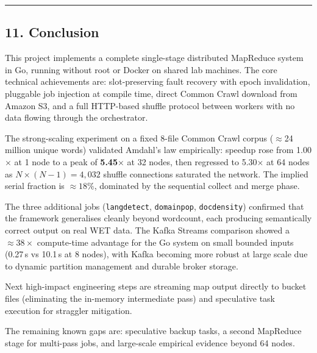 \documentclass[
]{article}
\begin{document}
\begin{center}\rule{0.5\linewidth}{0.5pt}\end{center}

\subsection{11. Conclusion}\label{conclusion}

This project implements a complete single-stage distributed MapReduce system
in Go, running without root or Docker on shared lab machines. The core
technical achievements are: slot-preserving fault recovery with epoch
invalidation, pluggable job injection at compile time, direct Common Crawl
download from Amazon S3, and a full HTTP-based shuffle protocol between workers
with no data flowing through the orchestrator.

The strong-scaling experiment on a fixed 8-file Common Crawl corpus
(\(\approx\)24 million unique words) validated Amdahl's law empirically:
speedup rose from 1.00$\times$ at 1 node to a peak of \textbf{5.45$\times$}
at 32 nodes, then regressed to 5.30$\times$ at 64 nodes as
\(N \times (N-1) = 4{,}032\) shuffle connections saturated the network.
The implied serial fraction is \(\approx 18\%\), dominated by the
sequential collect and merge phase.

The three additional jobs (\texttt{langdetect}, \texttt{domainpop},
\texttt{docdensity}) confirmed that the framework generalises cleanly beyond
wordcount, each producing semantically correct output on real WET data. The
Kafka Streams comparison showed a \(\approx 38\times\) compute-time advantage
for the Go system on small bounded inputs (0.27\,s vs 10.1\,s at 8 nodes),
with Kafka becoming more robust at large scale due to dynamic partition
management and durable broker storage.

Next high-impact engineering steps are streaming map output directly to bucket
files (eliminating the in-memory intermediate pass) and speculative task
execution for straggler mitigation.

The remaining known gaps are: speculative backup tasks, a second MapReduce
stage for multi-pass jobs, and large-scale empirical evidence beyond 64 nodes.
\end{document}
